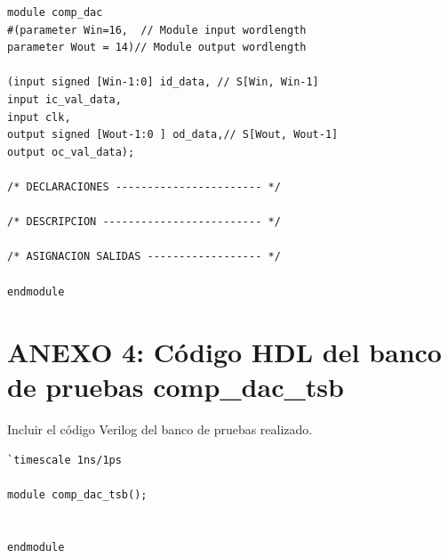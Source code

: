 \documentclass[parskip,a4paper,12pt]{article}
\begin{document}
\begin{verbatim}
module comp_dac
#(parameter Win=16,  // Module input wordlength
parameter Wout = 14)// Module output wordlength

(input signed [Win-1:0] id_data, // S[Win, Win-1]
input ic_val_data, 
input clk,
output signed [Wout-1:0 ] od_data,// S[Wout, Wout-1]
output oc_val_data); 
	
/* DECLARACIONES ----------------------- */

/* DESCRIPCION ------------------------- */	

/* ASIGNACION SALIDAS ------------------ */

endmodule 
\end{verbatim}




\section{ANEXO 4: Código HDL del banco de pruebas comp\_dac\_tsb}
\begin{enunciado}{}{}%
Incluir el código Verilog del banco de pruebas realizado.
\end{enunciado}

\begin{verbatim}
`timescale 1ns/1ps

module comp_dac_tsb();


endmodule 

\end{verbatim}
\end{document}
